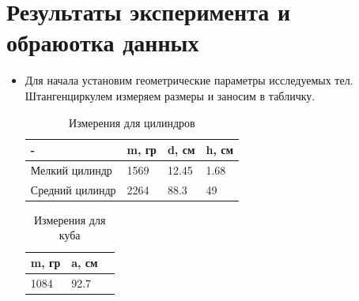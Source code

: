 \documentclass[a4paper,12pt]{article} %
\begin{document}
\section{Результаты эксперимента и обраюотка данных}
\begin{itemize}
    \item Для начала установим геометрические параметры исследуемых тел. 
Штангенциркулем измеряем размеры и заносим в табличку.
\begin{table}[!h]
    \centering
    \begin{tabular}{|l|l|l|l|} \hline
        - & m, гр & d, см & h, см  \\ \hline
        Мелкий цилиндр & 1569 & 12.45 & 1.68  \\ \hline
        Средний цилиндр & 2264 & 88.3 & 49  \\ \hline
    \end{tabular}
    \caption{Измерения для цилиндров}
\end{table}

\begin{table}[!ht]
    \centering
    \begin{tabular}{|l|l|l|}
    \hline
        m, гр & a, см  \\ \hline
        1084 & 92.7  \\ \hline
    \end{tabular}
    \caption{Измерения для куба}
\end{table}


\end{itemize}
\end{document}
